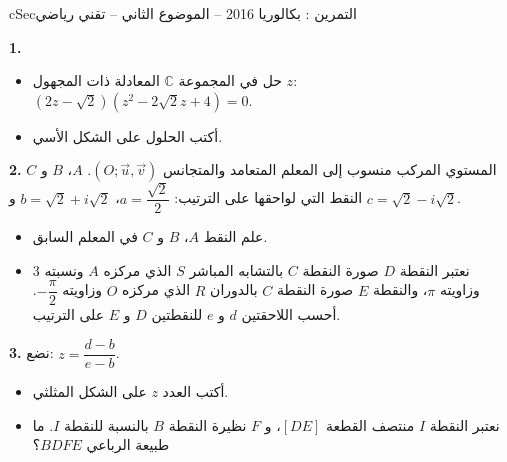 \documentclass[12pt,a4paper]{article}
\newenvironment{BOX}[2]{\begin{otherlanguage}{english}\begin{arbox}{#1}{#2}}{\end{arbox}\end{otherlanguage}}
\newcounter{exo}
\newenvironment{tamrin}[1]{\stepcounter{exo}\begin{BOX}{cSec}{التمرين \theexo: #1}}{\end{BOX}}
\newenvironment{sq}{\begin{itemize}[leftmargin=2.4em,itemsep=3pt]}{\end{itemize}}
\newcommand{\qa}{\item[(أ)]}\newcommand{\qb}{\item[(ب)]}\newcommand{\qc}{\item[(جـ)]}\newcommand{\qd}{\item[(د)]}\newcommand{\qe}{\item[(هـ)]}
\newcommand{\QQ}[1]{\par\smallskip\textbf{#1.} }
\begin{document}
\begin{tamrin}{بكالوريا 2016 -- الموضوع الثاني -- تقني رياضي}
\QQ{1}
\begin{sq}
\qa حل في المجموعة $\mathbb{C}$ المعادلة ذات المجهول $z$: $(2z-\sqrt2)(z^2-2\sqrt2z+4)=0$.
\qb أكتب الحلول على الشكل الأسي.
\end{sq}
\QQ{2} المستوي المركب منسوب إلى المعلم المتعامد والمتجانس $(O;\vec u,\vec v)$. $A$، $B$ و $C$ النقط التي لواحقها على الترتيب: $a=\dfrac{\sqrt2}{2}$، $b=\sqrt2+i\sqrt2$ و $c=\sqrt2-i\sqrt2$.
\begin{sq}
\qa علم النقط $A$، $B$ و $C$ في المعلم السابق.
\qb نعتبر النقطة $D$ صورة النقطة $C$ بالتشابه المباشر $S$ الذي مركزه $A$ ونسبته $3$ وزاويته $\pi$، والنقطة $E$ صورة النقطة $C$ بالدوران $R$ الذي مركزه $O$ وزاويته $-\dfrac{\pi}{2}$.
أحسب اللاحقتين $d$ و $e$ للنقطتين $D$ و $E$ على الترتيب.
\end{sq}
\QQ{3} نضع: $z=\dfrac{d-b}{e-b}$.
\begin{sq}
\qa أكتب العدد $z$ على الشكل المثلثي.
\qb نعتبر النقطة $I$ منتصف القطعة $[DE]$، و $F$ نظيرة النقطة $B$ بالنسبة للنقطة $I$. ما طبيعة الرباعي $BDFE$؟
\end{sq}
\end{tamrin}
\end{document}
